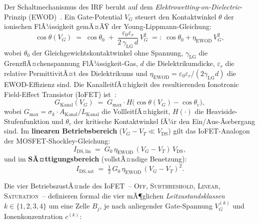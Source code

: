﻿\documentclass[12pt, a4paper, openany]{report}
\begin{document}
Der Schaltmechanismus des IRF beruht auf dem
\emph{Elektrowetting-on-Dielectric}-Prinzip (EWOD)~\cite{epp2026iono}.
Ein Gate-Potential $V_G$ steuert den Kontaktwinkel $\theta$ der ionischen
FlÃ¼ssigkeit gemÃ¤ÃŸ der Young-Lippmann-Gleichung:
\begin{equation}
  \label{eq:iono_ewod}
  \cos\theta(V_G) \;=\; \cos\theta_0
  \;+\; \frac{\varepsilon_0 \varepsilon_r}{2\,\gamma_{\mathrm{LG}}\,d}\,V_G^2
  \;=:\; \cos\theta_0 + \eta_{\mathrm{EWOD}}\,V_G^2,
\end{equation}
wobei $\theta_0$ der Gleichgewichtskontaktwinkel ohne Spannung,
$\gamma_{\mathrm{LG}}$ die GrenzflÃ¤chenspannung FlÃ¼ssigkeit-Gas,
$d$ die Dielektrikumdicke, $\varepsilon_r$ die relative PermittivitÃ¤t des
Dielektrikums und $\eta_{\mathrm{EWOD}} = \varepsilon_0\varepsilon_r/(2\gamma_{\mathrm{LG}}d)$
die EWOD-Effizienz sind.  Die KanalleitfÃ¤higkeit des resultierenden
Ionotronic Field-Effect Transistor (IoFET) ist~\cite{epp2026iono}:
\begin{equation}
  \label{eq:iono_gkanal}
  G_{\mathrm{Kanal}}(V_G)
  \;=\; G_{\max} \cdot H\!\bigl(\cos\theta(V_G) - \cos\theta_c\bigr),
\end{equation}
wobei $G_{\max} = \sigma_k \cdot A_{\mathrm{Kanal}} / L_{\mathrm{Kanal}}$
die VollleitfÃ¤higkeit, $H(\cdot)$ die Heaviside-Stufenfunktion und
$\theta_c$ der kritische Kontaktwinkel fÃ¼r den Ein/Aus-Ãœbergang sind.
Im \textbf{linearen Betriebsbereich} ($V_G - V_T \ll V_\mathrm{DS}$)
gilt das IoFET-Analogon der MOSFET-Shockley-Gleichung:
\begin{equation}
  \label{eq:iono_linear}
  I_\mathrm{DS,lin} \;=\; G_0\,\eta_{\mathrm{EWOD}}\,(V_G - V_T)\,V_\mathrm{DS},
\end{equation}
und im \textbf{SÃ¤ttigungsbereich} (vollstÃ¤ndige Benetzung):
\begin{equation}
  \label{eq:iono_sat}
  I_\mathrm{DS,sat} \;=\; \tfrac{1}{2}\,G_0\,\eta_{\mathrm{EWOD}}\,(V_G - V_T)^2.
\end{equation}

Die vier BetriebszustÃ¤nde des IoFET~-- \textsc{Off}, \textsc{Sub\-threshold},
\textsc{Linear}, \textsc{Saturation}~-- definieren formal die vier mÃ¶glichen
\emph{Leitzustandsklassen} $k \in \{1,2,3,4\}$ um eine Zelle $B_j$, je nach
anliegender Gate-Spannung $V_G^{(k)}$ und Ionenkonzentration $c^{(k)}$:
\end{document}
